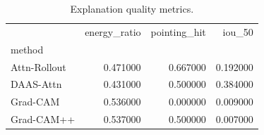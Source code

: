 \begin{table}
\caption{Explanation quality metrics.}
\label{tab:xai}
\begin{tabular}{lrrr}
\toprule
 & energy_ratio & pointing_hit & iou_50 \\
method &  &  &  \\
\midrule
Attn-Rollout & 0.471000 & 0.667000 & 0.192000 \\
DAAS-Attn & 0.431000 & 0.500000 & 0.384000 \\
Grad-CAM & 0.536000 & 0.000000 & 0.009000 \\
Grad-CAM++ & 0.537000 & 0.500000 & 0.007000 \\
\bottomrule
\end{tabular}
\end{table}
